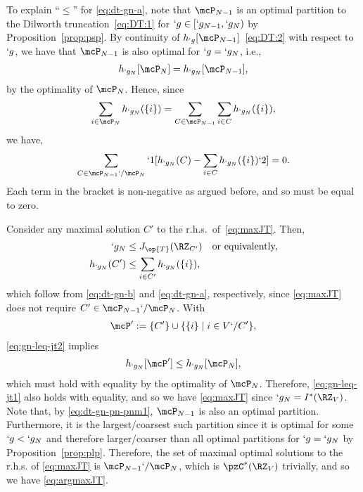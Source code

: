 \begin{Proof}
\begin{compactitem}
	\item To explain ``$\leq$'' for \eqref{eq:dt-gn-a}, note that $\mcP_{N-1}$ is an optimal partition to the
		Dilworth truncation~\eqref{eq:DT:1} for $`g\in [`g_{N-1},`g_N)$ by Proposition~\ref{prop:psp}.
			By continuity of $h_{`g}[\mcP_{N-1}]$~\eqref{eq:DT:2} with respect to $`g$, we have that
			$\mcP_{N-1}$ is also optimal for $`g=`g_N$, i.e.,
	\begin{align}
	h_{`g_{N}}[\mcP_N] = h_{`g_{N}}[\mcP_{N-1}],
	\label{eq:dt-gn-pn-pnm1}
	\end{align}
	by the optimality of $\mcP_N$. Hence, since
	\begin{align*}
	\sum\limits_{i\in \mcP_{N}} h_{`g_{N}}(\{i\})  = \sum\limits_{C\in \mcP_{N-1}} \sum\limits_{i\in C} h_{`g_{N}}(\{i\}),
	\end{align*}
	we have,
	\begin{align*}
	\sum_{C\in\mcP_{N-1}`/\mcP_N}`1[h_{`g_{N}}(C)-\sum_{i\in C}h_{`g_{N}}(\Set{i})`2]=0.
	\end{align*}
	Each term in the bracket is non-negative as argued before, and so must be equal to zero.
\end{compactitem}
		
	Consider any maximal solution $C'$ to the r.h.s.\ of~\eqref{eq:maxJT}. Then,
	\begin{subequations}
		\label{eq:`g_N<JT(C')}
		\begin{align}
			`g_{N}& \leq J_{\op{T}}(\RZ_{C'}) \kern1em \text{or equivalently,} \label{eq:gn-leq-jt1}\\ %
			h_{`g_{N}}(C')& \leq \sum_{i\in C'}h_{`g_{N}}(\Set{i}), \label{eq:gn-leq-jt2} %
		\end{align}
	\end{subequations}
	which follow from \eqref{eq:dt-gn-b} and \eqref{eq:dt-gn-a}, respectively, since \eqref{eq:maxJT}
	does not require $C'\in \mcP_{N-1}`/\mcP_N$. With
	\begin{align*}
		\mcP':=\Set{C'}\cup\Set{\Set{i}\mid i\in V`/C'},
	\end{align*}
	\eqref{eq:gn-leq-jt2} implies
	\begin{align*}
		h_{`g_N}[\mcP'] \leq h_{`g_N}[\mcP_N],
	\end{align*}
	which must hold with equality by the optimality of $\mcP_N$. Therefore, \eqref{eq:gn-leq-jt1}
	also holds with equality, and so we have \eqref{eq:maxJT} since $`g_N=I^*(\RZ_V)$. Note that, by
	\eqref{eq:dt-gn-pn-pnm1}, $\mcP_{N-1}$ is also an optimal partition. Furthermore, it is the largest/coarsest such
	partition since it is optimal for some $`g<`g_N$ and therefore larger/coarser than all optimal
	partitions for $`g=`g_N$ by Proposition~\ref{prop:plp}. Therefore, the set of maximal optimal
	solutions to the r.h.s. of \eqref{eq:maxJT}  is $\mcP_{N-1}`/\mcP_N$, which is $\pzC^*(\RZ_V)$
	trivially, and so we have \eqref{eq:argmaxJT}.
	

\end{Proof}
